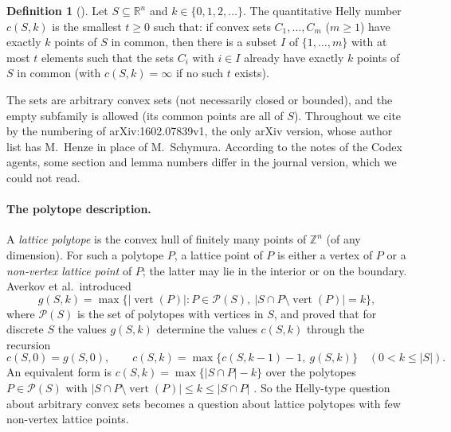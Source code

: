 \documentclass[11pt]{article}
\theoremstyle{definition}
\newtheorem{definition}{Definition}
\theoremstyle{remark}
\newcommand{\Z}{\mathbb Z}
\newcommand{\R}{\mathbb R}
\newcommand{\vertx}{\operatorname{vert}}
\begin{document}
\begin{definition}[{\cite[Definition~1]{agm}}]\label{def:c}
Let $S\subseteq\R^n$ and $k\in\{0,1,2,\dots\}$. The quantitative Helly number
$c(S,k)$ is the smallest $t\ge0$ such that: if convex sets $C_1,\dots,C_m$
($m\ge1$) have exactly $k$ points of $S$ in common, then there is a subset $I$
of $\{1,\dots,m\}$ with at most $t$ elements such that the sets $C_i$ with
$i\in I$ already have exactly $k$ points of $S$ in common (with
$c(S,k)=\infty$ if no such $t$ exists).
\end{definition}

\noindent The sets are arbitrary convex sets (not necessarily closed or
bounded), and the empty subfamily is allowed (its common points are all of
$S$). Throughout we cite~\cite{agm} by the numbering of arXiv:1602.07839v1,
the only arXiv version, whose author list has M.~Henze in place of
M.~Schymura. According to the notes of the Codex agents, some section and lemma
numbers differ in the journal version, which we could not read.

\paragraph{The polytope description.}
A \emph{lattice polytope} is the convex hull of finitely many points of $\Z^n$
(of any dimension). For such a polytope $P$, a lattice point of $P$ is either a
vertex of $P$ or a \emph{non-vertex lattice point} of $P$; the latter may lie
in the interior or on the boundary. Averkov et al.\ introduced
\[
g(S,k)=\max\{|\vertx(P)| : P\in\mathcal P(S),\ |S\cap P\setminus\vertx(P)|=k\},
\]
where $\mathcal P(S)$ is the set of polytopes with vertices in $S$, and proved
that for discrete $S$ the values $g(S,k)$ determine the values $c(S,k)$ through
the recursion~\cite[Theorem~2,~(5)]{agm}
\begin{equation}\label{eq:rec}
c(S,0)=g(S,0),\qquad c(S,k)=\max\{c(S,k-1)-1,\ g(S,k)\}\quad (0<k\le|S|).
\end{equation}
An equivalent form is $c(S,k)=\max\{|S\cap P|-k\}$ over the polytopes
$P\in\mathcal P(S)$ with $|S\cap P\setminus\vertx(P)|\le k\le|S\cap P|$
\cite[(6)]{agm}. So the Helly-type question about arbitrary convex sets
becomes a question about lattice polytopes with few non-vertex lattice points.
\end{document}
